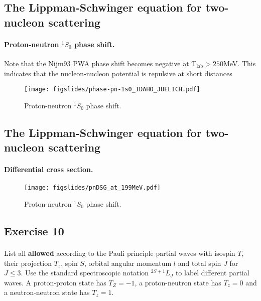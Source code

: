 \documentclass[%
twoside,                 %
final,                   %
10pt]{article}
\begin{document}
\noindent


\subsection*{The Lippman-Schwinger equation for two-nucleon scattering}

\paragraph{Proton-neutron $^1S_0$ phase shift.}

Note that the Nijm93 PWA phase shift becomes negative at T$_{\mathrm{lab}}> 250$MeV. This indicates that the nucleon-nucleon potential is repulsive at short distances 

\begin{figure}[ht]
  \centerline{\texttt{[image: figslides/phase-pn-1s0\_IDAHO\_JUELICH.pdf]}}
  \caption{
  Proton-neutron $^1S_0$ phase shift.
  }
\end{figure}


\subsection*{The Lippman-Schwinger equation for two-nucleon scattering}

\paragraph{Differential cross section.}

\begin{figure}[ht]
  \centerline{\texttt{[image: figslides/pnDSG\_at\_199MeV.pdf]}}
  \caption{
  Proton-neutron $^1S_0$ phase shift.
  }
\end{figure}




\subsection*{Exercise 10}

\paragraph{}
List all \textbf{allowed} according to the Pauli principle partial waves with isospin $T$, their 
projection $T_z$, spin $S$, orbital angular momentum $l$ and total spin $J$ for $J\le 3$.
Use the standard spectroscopic notation $^{2S+1}L_J$ to label different partial waves. A proton-proton state
has $T_Z=-1$, a proton-neutron state has $T_z=0$ and a neutron-neutron state has $T_z=1$.
\end{document}
